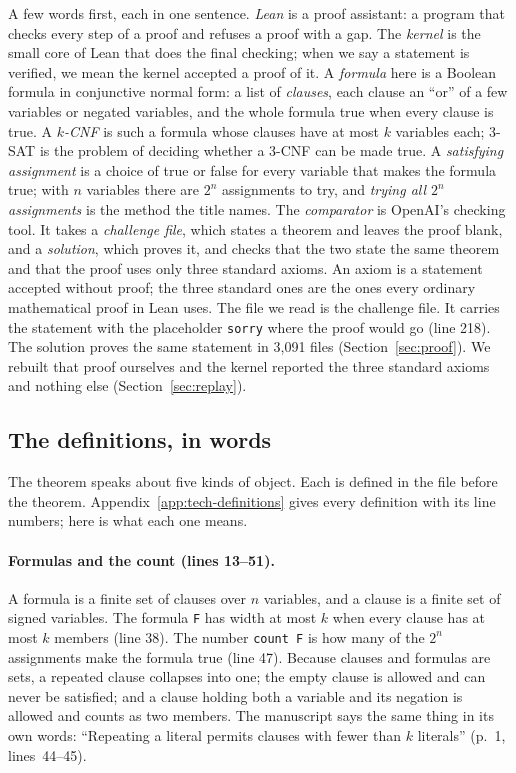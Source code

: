 A few words first, each in one sentence.
\emph{Lean} is a proof assistant: a program that checks every step of a
proof and refuses a proof with a gap.
The \emph{kernel} is the small core of Lean that does the final
checking; when we say a statement is verified, we mean the kernel
accepted a proof of it.
A \emph{formula} here is a Boolean formula in conjunctive normal form: a
list of \emph{clauses}, each clause an ``or'' of a few variables or
negated variables, and the whole formula true when every clause is
true. A \emph{$k$-CNF} is such a formula whose clauses have at most $k$
variables each; 3-SAT is the problem of deciding whether a 3-CNF can be
made true.
A \emph{satisfying assignment} is a choice of true or false for every
variable that makes the formula true; with $n$ variables there are
$2^n$ assignments to try, and \emph{trying all $2^n$ assignments} is the
method the title names.
The \emph{comparator} is OpenAI's checking tool. It takes a
\emph{challenge file}, which states a theorem and leaves the proof blank,
and a \emph{solution}, which proves it, and checks that the two state
the same theorem and that the proof uses only three standard axioms. An axiom is a statement accepted without proof; the three standard ones are the ones every ordinary mathematical proof in Lean uses.
The file we read is the challenge file. It carries the statement with
the placeholder \texttt{sorry} where the proof would go (line 218). The
solution proves the same statement in 3,091 files
(Section~\ref{sec:proof}). We rebuilt that proof ourselves and the
kernel reported the three standard axioms and nothing else
(Section~\ref{sec:replay}).

\subsection{The definitions, in words}
\label{sec:statement-definitions}

The theorem speaks about five kinds of object. Each is defined in the
file before the theorem. Appendix~\ref{app:tech-definitions} gives
every definition with its line numbers; here is what each one means.

\paragraph{Formulas and the count (lines 13--51).}
A formula is a finite set of clauses over $n$ variables, and a clause is
a finite set of signed variables. The formula \texttt{F} has width at
most $k$ when every clause has at most $k$ members (line 38). The number
\texttt{count F} is how many of the $2^n$ assignments make the formula
true (line 47). Because clauses and formulas are sets, a repeated clause
collapses into one; the empty clause is allowed and can never be
satisfied; and a clause holding both a variable and its negation is
allowed and counts as two members. The manuscript says the same thing in
its own words: ``Repeating a literal permits clauses with fewer than
\(k\) literals'' (p.~1, lines~44--45).

